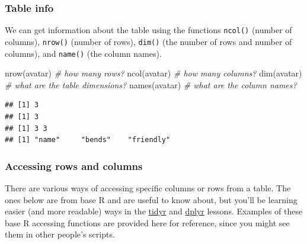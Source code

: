 \documentclass[
  oneside]{book}
\newenvironment{Shaded}{\begin{snugshade}}{\end{snugshade}}
\newcommand{\CommentTok}[1]{\textcolor[rgb]{0.56,0.35,0.01}{\textit{#1}}}
\newcommand{\DecValTok}[1]{\textcolor[rgb]{0.00,0.00,0.81}{#1}}
\newcommand{\FunctionTok}[1]{\textcolor[rgb]{0.00,0.00,0.00}{#1}}
\newcommand{\NormalTok}[1]{#1}
\newcommand{\OtherTok}[1]{\textcolor[rgb]{0.56,0.35,0.01}{#1}}
\newcommand{\SpecialCharTok}[1]{\textcolor[rgb]{0.00,0.00,0.00}{#1}}
\newcommand{\StringTok}[1]{\textcolor[rgb]{0.31,0.60,0.02}{#1}}
\begin{document}
\hypertarget{table-info}{%
\subsubsection{Table info}\label{table-info}}

We can get information about the table using the functions \texttt{ncol()} (number of columns), \texttt{nrow()} (number of rows), \texttt{dim()} (the number of rows and number of columns), and \texttt{name()} (the column names).

\begin{Shaded}
\begin{Highlighting}[]
\FunctionTok{nrow}\NormalTok{(avatar) }\CommentTok{\# how many rows?}
\FunctionTok{ncol}\NormalTok{(avatar) }\CommentTok{\# how many columns?}
\FunctionTok{dim}\NormalTok{(avatar)  }\CommentTok{\# what are the table dimensions?}
\FunctionTok{names}\NormalTok{(avatar) }\CommentTok{\# what are the column names?}
\end{Highlighting}
\end{Shaded}

\begin{verbatim}
## [1] 3
## [1] 3
## [1] 3 3
## [1] "name"     "bends"    "friendly"
\end{verbatim}

\hypertarget{row-col-access}{%
\subsubsection{Accessing rows and columns}\label{row-col-access}}

There are various ways of accessing specific columns or rows from a table. The ones below are from base R and are useful to know about, but you'll be learning easier (and more readable) ways in the \protect\hyperlink{tidyr}{tidyr} and \protect\hyperlink{dplyr}{dplyr} lessons. Examples of these base R accessing functions are provided here for reference, since you might see them in other people's scripts.

\begin{Shaded}
\end{Shaded}
\end{document}
